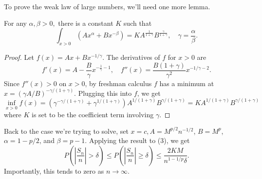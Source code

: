 \documentclass[11pt,letterpaper]{article}
\begin{document}
\begin{solution}
\quad To prove the weak law of large numbers, we'll need one more lemma.
\begin{claim}
    For any $\alpha, \beta > 0,$ there is a constant $K$ such that
    \[
        \int_{x > 0} \left(Ax^\alpha + Bx^{-\beta}\right) = KA^{\frac{1}{1+\gamma}}B^{\frac{\gamma}{1+\gamma}},\quad \gamma = \frac{\alpha}{\beta}
    .\] 
\end{claim}
\begin{proof}
    Let $f(x)=Ax+Bx^{-1 /\gamma}$. The derivatives of $f$ for $x>0$ are 
    \[
        f'(x)=A - \frac{B}{\gamma}x^{-\frac{1}{\gamma}-1},\quad f''(x)=\frac{B(1+\gamma)}{\gamma^2}x^{-1 /\gamma - 2}
    .\] 
    Since $f''(x)>0$ on $x>0$, by freshman calculus $f$ has a minimum at $x=\left(\gamma A / B\right)^{-\gamma / (1+ \gamma)}$. Plugging this into $f$, we get
    \[
        \inf_{x>0}f(x) = \left(\gamma^{-\gamma / (1+\gamma)}+\gamma^{1 / (1+\gamma)}\right)A^{1 / (1+\gamma)}B^{\gamma / (1+ \gamma)} = KA^{1 / (1+\gamma)}B^{\gamma / (1+ \gamma)}
    \]
    where $K$ is set to be the coefficient term involving $\gamma$. 
\end{proof}

\quad Back to the case we're trying to solve, set $x=c, A=M^{p /2}n^{-1 /2}$, $B=M^p$, $\alpha = 1 - p /2$, and $\beta=p-1$. Applying the result to (3), we get
\[
    P\left(\left|\frac{S_n}{n}\right| > \delta\right) \leq P\left(\left|\frac{S_n}{n}\right| \geq \delta\right) \leq \frac{2KM}{n^{1-1/p}\delta}
.\] 
Importantly, this tends to zero as $n\to\infty$.

\end{solution}
\end{document}
